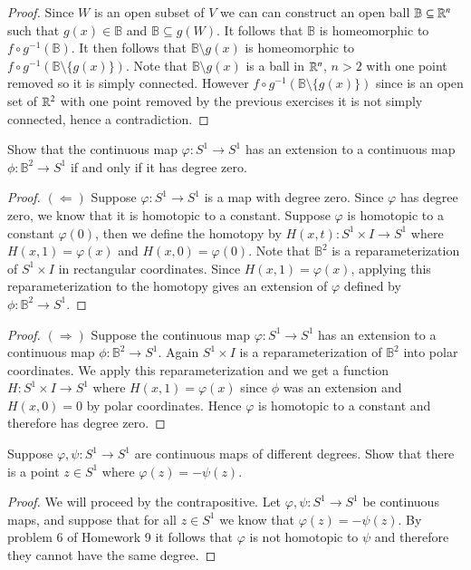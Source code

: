\documentclass{homework651}
\newcommand{\bbB}{\mathbb{B}}
\begin{document}
\begin{problems}
\begin{proof}
    Since $W$ is an open subset of $V$ we can can construct an open ball $\bbB \subseteq \RR^n$ such that $g(x) \in \bbB$ and $\bbB \subseteq g(W)$. It follows that $\bbB$ is homeomorphic to $f \circ g^{-1} (\bbB)$. It then follows that $\bbB \setminus g(x)$ is homeomorphic to $f \circ g^{-1} (\bbB \setminus \{g(x)\})$. Note that $\bbB  \setminus g(x)$ is a ball in $\mathbb R^n$, $n > 2$ with one point removed so it is simply connected. However $f \circ g^{-1} (\bbB \setminus \{g(x)\})$ since is an open set of $\mathbb R^2$ with one point removed by the previous exercises it is not simply connected, hence a contradiction.
    
\end{proof}






\problem Show that the continuous map $\varphi: S^1 \to S^1$ has an extension to a continuous map $\phi:\bbB^2 \to S^1$ 
if and only if it has degree zero. 

\begin{proof}$(\Leftarrow)$ Suppose $\varphi: S^1 \to S^1$ is a map with degree zero. Since $\varphi$ has degree zero, we know that it is homotopic to a constant. Suppose $\varphi$ is homotopic to a constant $\varphi(0)$, then we define the homotopy by $H(x, t): S^1 \times I \to S^1$ where $H(x, 1) = \varphi(x)$ and $H(x, 0) = \varphi(0)$. Note that $\bbB^2$ is a reparameterization of $S^1 \times I$ in rectangular coordinates. Since $H(x, 1) = \varphi(x)$, applying this reparameterization to the homotopy gives an extension of $\varphi$ defined by $\phi:\bbB^2 \to S^1$. 
\end{proof}


\begin{proof}$(\Rightarrow)$ Suppose the continuous map $\varphi: S^1 \to S^1$ has an extension to a continuous map $\phi:\bbB^2 \to S^1$. Again $S^1 \times I$ is a reparameterization of $\bbB^2$ into polar coordinates. We apply this reparameterization and we get a function $H: S^1 \times I \to S^1$ where $H(x, 1) = \varphi(x)$ since $\phi$ was an extension and $H(x, 0) = 0$ by polar coordinates. Hence $\varphi$ is homotopic to a constant and therefore has degree zero. 
\end{proof}




\problem Suppose $\varphi, \psi: S^1 \to S^1$ are continuous maps of different degrees. Show that there is a point $z \in S^1$ 
where $\varphi(z) = -\psi(z)$. 
\begin{proof} We will proceed by the contrapositive. Let $\varphi, \psi: S^1 \to S^1$ be continuous maps, and suppose that for all $z \in  S^1$ we know that $\varphi(z) = -\psi(z)$.
By problem 6 of Homework 9 it follows that $\varphi$ is not homotopic to $\psi$ and therefore 
they cannot have the same degree. 
\end{proof}

\end{problems}
\end{document}
